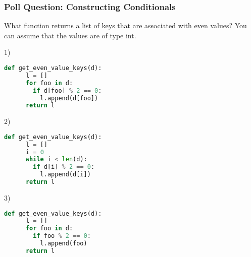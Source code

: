 \documentclass{beamer}
\begin{document}
%
%
\begin{frame}[fragile]
	\frametitle{Poll Question: Constructing Conditionals}
  What function returns a list of keys that are associated with even values? You can assume that the values are of type int.
	\vfill
	\begin{minipage}{0.32\textwidth}
    1)
		\begin{lstlisting}[language=Python, autogobble,basicstyle=\tiny,numbers=none]
    def get_even_value_keys(d):
      l = []
      for foo in d:
        if d[foo] % 2 == 0:
          l.append(d[foo])
      return l
		\end{lstlisting}
	\end{minipage}
	\begin{minipage}{0.32\textwidth}
    2)
		\begin{lstlisting}[language=Python, autogobble,basicstyle=\tiny,numbers=none]
    def get_even_value_keys(d):
      l = []
      i = 0
      while i < len(d):
        if d[i] % 2 == 0:
          l.append(d[i])
      return l
		\end{lstlisting}
	\end{minipage}
	\begin{minipage}{0.32\textwidth}
    3)
		\begin{lstlisting}[language=Python, autogobble,basicstyle=\tiny,numbers=none]
    def get_even_value_keys(d):
      l = []
      for foo in d:
        if foo % 2 == 0:
          l.append(foo)
      return l
		\end{lstlisting}
	\end{minipage}
\end{frame}
\end{document}
